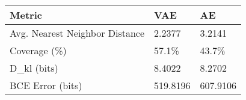 \begin{tabular}{lll}
\toprule
Metric & VAE & AE \\
\midrule
Avg. Nearest Neighbor Distance & 2.2377 & 3.2141 \\
Coverage (\%) & 57.1\% & 43.7\% \\
D\_kl (bits) & 8.4022 & 8.2702 \\
BCE Error (bits) & 519.8196 & 607.9106 \\
\bottomrule
\end{tabular}

